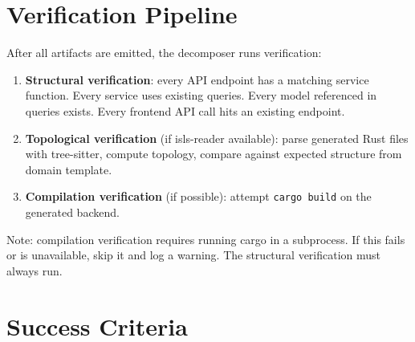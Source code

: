 \documentclass[11pt,a4paper]{article}
\begin{document}
\section{Verification Pipeline}

After all artifacts are emitted, the decomposer runs verification:

\begin{enumerate}
\item \textbf{Structural verification}: every API endpoint has a
  matching service function. Every service uses existing queries.
  Every model referenced in queries exists. Every frontend API call
  hits an existing endpoint.

\item \textbf{Topological verification} (if isls-reader available):
  parse generated Rust files with tree-sitter, compute topology,
  compare against expected structure from domain template.

\item \textbf{Compilation verification} (if possible): attempt
  \texttt{cargo build} on the generated backend.
\end{enumerate}

Note: compilation verification requires running cargo in a subprocess.
If this fails or is unavailable, skip it and log a warning. The
structural verification must always run.

\section{Success Criteria}
\end{document}
